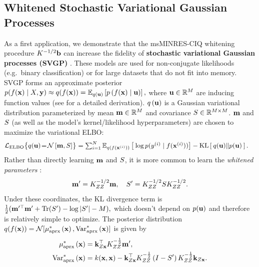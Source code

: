 \subsection{Whitened Stochastic Variational Gaussian Processes}
\label{sec:variational_results}

As a first application, we demonstrate that the msMINRES-CIQ whitening procedure $K^{-1/2} \mathbf{b}$ can increase the fidelity of {\bf stochastic variational Gaussian processes (SVGP)} \cite{hensman2013gaussian,hensman2015scalable,matthews2017scalable}.
These models are used for non-conjugate likelihoods (e.g.~binary classification) or for large datasets that do not fit into memory.
SVGP forms an approximate posterior
$
  p(f(\mathbf{x}) \mid X, \mathbf{y}) \approx q(f(\mathbf{x})) = \operatorname*{\mathbb{E}}_{q(\mathbf{u})} \left[  p\left( f(\mathbf{x}) \mid \mathbf{u} \right) \right],
$
where $\mathbf{u} \in \mathbb{R}^M$ are {inducing function values} (see \citep{hensman2015scalable,matthews2017scalable} for a detailed derivation).
$q \left( \mathbf{u} \right)$ is a Gaussian variational distribution parameterized by mean $\mathbf{m} \in \mathbb{R}^M$ and covariance $S \in \mathbb{R}^{M \times M}$.
$\mathbf{m}$ and $S$ (as well as the model's kernel/likelihood hyperparameters) are chosen to maximize the variational ELBO:
%
\begin{align*}
  \loglik_\text{ELBO}\bigl\{ q(\bu) \! = \! \normaldist{\bmm}{\bS} \bigr\} &= \textstyle\sum_{i=1}^N \Evover{q(f(\bx^{(i)}))}{  \: \log p( y^{(i)} \mid f(\bx^{(i)}) ) } - \kl{ q(\bu) }{ p(\bu) }.
\end{align*}
%
Rather than directly learning $\mathbf{m}$ and $S$, it is more common to learn the \emph{whitened parameters} \cite{kuss2005assessing,matthews2017scalable}:
$$ \mathbf{m}' = K_{ZZ}^{- 1/ 2} \mathbf{m}, \quad S' = K_{ZZ}^{-1 / 2} S K_{ZZ}^{-1 / 2}. $$
Under these coordinates, the KL divergence term is
$\frac{1}{2} ( \bmm^{\prime \top} \bmm' + \tr{ \bS' } - \log \vert \bS' \vert - M ),$
%
which doesn't depend on $p(\mathbf{u})$ and therefore is relatively simple to optimize.
The posterior distribution $q(f(\bx)) = \normaldist{\ameantest{\bx}}{\avartest{\bx}}$ is given by
%
\begin{equation}
  \begin{split}
    \mu^*_\text{aprx} \left( \mathbf{x} \right) &= \mathbf{k}_{Z\mathbf{x}}^\top K_{ZZ}^{-\frac 1 2} \mathbf{m}',
    \\
    \text{Var}^*_\text{aprx} \left( \mathbf{x} \right) &= k(\mathbf{x}, \mathbf{x}) -
      \mathbf{k}_{Z\mathbf{x}}^\top K_{ZZ}^{-\frac 1 2} \left( I - S' \right) K_{ZZ}^{-\frac 1 2} \mathbf{k}_{Z\mathbf{x}}.
  \end{split}
  \label{eqn:approx_pred_dist}
\end{equation}

